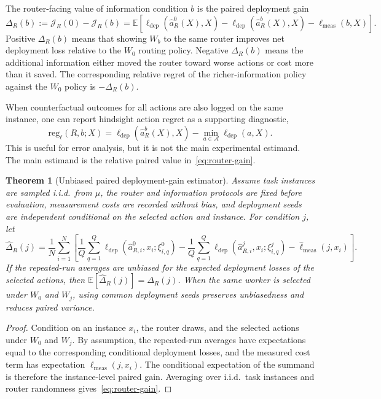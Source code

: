 \documentclass{article}
\newtheorem{theorem}{Theorem}
\newcommand{\cA}{\mathcal{A}}
\newcommand{\E}{\mathbb{E}}
\newcommand{\J}{\mathcal{J}}
\newcommand{\reg}{\mathrm{reg}}
\begin{document}
The router-facing value of information condition $b$ is the paired deployment gain
\begin{equation}
\Delta_R(b)
:=
\J_R(0)-\J_R(b)
=
\E\!\left[
\ell_{\mathrm{dep}}(\hat a_R^0(X),X)
-
\ell_{\mathrm{dep}}(\hat a_R^b(X),X)
-
\ell_{\mathrm{meas}}(b,X)
\right].
\label{eq:router-gain}
\end{equation}
Positive $\Delta_R(b)$ means that showing $W_b$ to the same router improves net deployment loss relative to the $W_0$ routing policy.
Negative $\Delta_R(b)$ means the additional information either moved the router toward worse actions or cost more than it saved.
The corresponding relative regret of the richer-information policy against the $W_0$ policy is $-\Delta_R(b)$.

When counterfactual outcomes for all actions are also logged on the same instance, one can report hindsight action regret as a supporting diagnostic,
\[
\reg_\ell(R,b;X)
=
\ell_{\mathrm{dep}}(\hat a_R^b(X),X)-\min_{a\in\cA}\ell_{\mathrm{dep}}(a,X).
\]
This is useful for error analysis, but it is not the main experimental estimand.
The main estimand is the relative paired value in~\eqref{eq:router-gain}.

\begin{theorem}[Unbiased paired deployment-gain estimator]
\label{thm:paired-unbiased}
Assume task instances are sampled i.i.d.\ from $\mu$, the router and information protocols are fixed before evaluation, measurement costs are recorded without bias, and deployment seeds are independent conditional on the selected action and instance.
For condition $j$, let
\[
\widehat{\Delta}_R(j)
=
\frac{1}{N}\sum_{i=1}^N
\left[
\frac{1}{Q}\sum_{q=1}^{Q}
\ell_{\mathrm{dep}}(\hat a_{R,i}^0,x_i;\xi_{i,q}^{0})
-
\frac{1}{Q}\sum_{q=1}^{Q}
\ell_{\mathrm{dep}}(\hat a_{R,i}^j,x_i;\xi_{i,q}^{j})
-
\widehat{\ell}_{\mathrm{meas}}(j,x_i)
\right].
\]
If the repeated-run averages are unbiased for the expected deployment losses of the selected actions, then
$\E[\widehat{\Delta}_R(j)]=\Delta_R(j)$.
When the same worker is selected under $W_0$ and $W_j$, using common deployment seeds preserves unbiasedness and reduces paired variance.
\end{theorem}

\begin{proof}
Condition on an instance $x_i$, the router draws, and the selected actions under $W_0$ and $W_j$.
By assumption, the repeated-run averages have expectations equal to the corresponding conditional deployment losses, and the measured cost term has expectation $\ell_{\mathrm{meas}}(j,x_i)$.
The conditional expectation of the summand is therefore the instance-level paired gain.
Averaging over i.i.d.\ task instances and router randomness gives~\eqref{eq:router-gain}.
\end{proof}
\end{document}

